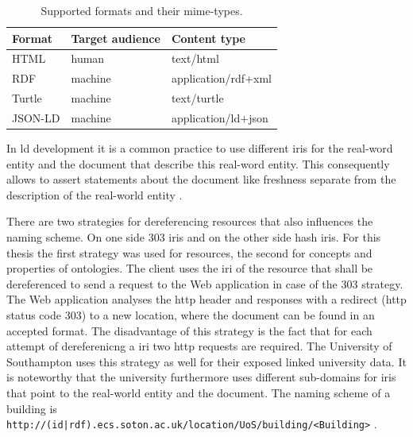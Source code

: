 \documentclass[draft,final]{vutinfth} %
\begin{document}
\begin{table}
  \centering
  \begin{tabular}{| l | l | l |}
    \hline 
       Format & Target audience & Content type \\ \hline \hline
       HTML & human & text/html \\ \hline
       RDF & machine & application/rdf$+$xml \\ \hline
       Turtle & machine & text/turtle \\ \hline
       JSON-LD & machine & application/ld$+$json \\ \hline
  \end{tabular}
  \caption{Supported formats and their mime-types.}
  \label{tab:olution-architectural-prototype:format-table}
\end{table}

In \gls{ld} development it is a common practice to use different \gls{iri}s for the real-word entity and the document that describe this real-word entity. This consequently allows to assert statements about the document like freshness separate from the description of the real-world entity \cite{bizer_linked_2009}. 

There are two strategies for dereferencing resources that also influences the naming scheme. On one side 303 \gls{iri}s and on the other side hash \gls{iri}s. For this thesis the first strategy was used for resources, the second for concepts and properties of ontologies. The client uses the \gls{iri} of the resource that shall be dereferenced to send a request to the Web application in case of the 303 strategy. The Web application analyses the \gls{http} header and responses with a redirect (\gls{http} status code 303) to a new location, where the document can be found in an accepted format. The disadvantage of this strategy is the fact that for each attempt of dereferenicng a \gls{iri} two \gls{http} requests are required. The University of Southampton uses this strategy as well for their exposed linked university data. It is noteworthy that the university furthermore uses different sub-domains for \gls{iri}s that point to the real-world entity and the document. The naming scheme of a building is \texttt{http://(id|rdf).ecs.soton.ac.uk/location/UoS/building/<Building>} \cite{cobden_ecs_????}. 
\end{document}
